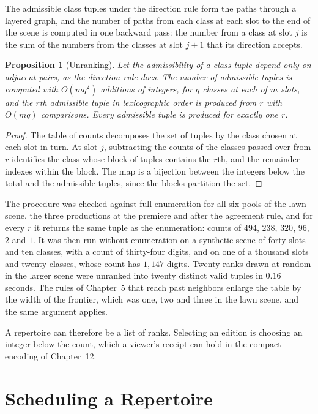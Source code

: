 \documentclass[11pt,twoside,openright]{book}
\theoremstyle{plain}
\newtheorem{proposition}[theorem]{Proposition}
\theoremstyle{definition}
\theoremstyle{remark}
\begin{document}
The admissible class tuples under the direction rule form the paths through a layered graph, and the number of paths from each class at each slot to the end of the scene is computed in one backward pass: the number from a class at slot $j$ is the sum of the numbers from the classes at slot $j+1$ that its direction accepts.

\begin{proposition}[Unranking]\label{prop:unrank}
Let the admissibility of a class tuple depend only on adjacent pairs, as the direction rule does. The number of admissible tuples is computed with $O(mq^2)$ additions of integers, for $q$ classes at each of $m$ slots, and the $r$th admissible tuple in lexicographic order is produced from $r$ with $O(mq)$ comparisons. Every admissible tuple is produced for exactly one $r$.
\end{proposition}

\begin{proof}
The table of counts decomposes the set of tuples by the class chosen at each slot in turn. At slot $j$, subtracting the counts of the classes passed over from $r$ identifies the class whose block of tuples contains the $r$th, and the remainder indexes within the block. The map is a bijection between the integers below the total and the admissible tuples, since the blocks partition the set.
\end{proof}

The procedure was checked against full enumeration for all six pools of the lawn scene, the three productions at the premiere and after the agreement rule, and for every $r$ it returns the same tuple as the enumeration: counts of $494$, $238$, $320$, $96$, $2$ and $1$. It was then run without enumeration on a synthetic scene of forty slots and ten classes, with a count of thirty-four digits, and on one of a thousand slots and twenty classes, whose count has $1{,}147$ digits. Twenty ranks drawn at random in the larger scene were unranked into twenty distinct valid tuples in $0.16$ seconds. The rules of Chapter~5 that reach past neighbors enlarge the table by the width of the frontier, which was one, two and three in the lawn scene, and the same argument applies.

A repertoire can therefore be a list of ranks. Selecting an edition is choosing an integer below the count, which a viewer's receipt can hold in the compact encoding of Chapter~12.

\section{Scheduling a Repertoire}\label{sec:schedule13}
\end{document}
